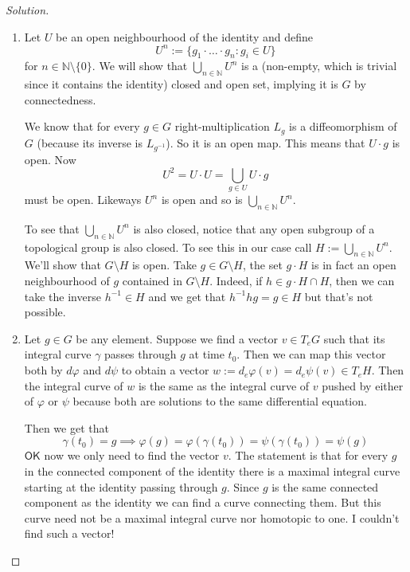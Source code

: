 \begin{proof}[Solution]\leavevmode
	\begin{enumerate}[label=\alph*.]
		\item Let $U$ be an open  neighbourhood of the identity and define
			\[U^n:=\{g_1\cdot\ldots \cdot g_n:g_{i}\in U\}\]
		for $n \in\mathbb{N}\setminus\{0\}$. We will show that $\bigcup_{n \in\mathbb{N}} U^n$ is a (non-empty, which is trivial since it contains the identity) closed and open set, implying it is $G$ by connectedness.

		We know that for every $g\in G$ right-multiplication $L_g$  is a diffeomorphism of $G$ (because its inverse is $L_{g^{-1}}$). So it is an open map. This means that $U\cdot g$ is open. Now
		\[U^2=U\cdot U=\bigcup_{g\in U}U\cdot g \]
		must be open. Likeways $U^n$ is open and so is $\bigcup_{n \in\mathbb{N}} U^n$.

		To see that $\bigcup_{n \in\mathbb{N}} U^n$ is also closed, notice that any open subgroup of a topological group is also closed. To see this in our case call $H:=\bigcup_{n \in\mathbb{N}} U^n$. We'll show that $G\setminus H$ is open. Take $g \in G\setminus H$, the set $g\cdot H$ is in fact an open neighbourhood of $g$ contained in $G\setminus H$. Indeed, if $h\in g\cdot H\cap H$, then we can take the inverse $h^{-1}\in H$ and we get that $h^{-1}hg=g\in H$ but that's not possible.



		\item Let $g\in G$ be any element. Suppose we find a vector $v\in T_eG$ such that its integral curve $\gamma$ passes through $g$ at time $t_0$. Then we can map this vector both by $d\varphi$ and $d\psi$ to obtain a vector $w:=d_e\varphi(v)=d_e\psi(v)\in T_eH$. Then the integral curve of  $w$ is the same as the integral curve of $v$ pushed by either of  $\varphi$ or $\psi$ because both are solutions to the same differential equation.

			Then we get that
			\[\gamma(t_0)=g\implies \varphi(g)=\varphi(\gamma(t_0))=\psi(\gamma(t_0))=\psi(g)\]
$\mathsf{OK}$ now we only need to find the vector $v$. The statement is that for every $g$ in the connected component of the identity there is a maximal integral curve starting at the identity passing through $g$. Since $g$ is the same connected component as the identity we can find a curve connecting them. But this curve need not be a maximal integral curve nor homotopic to one. {\color{3}I couldn't find such a vector!} 

	\end{enumerate}
\end{proof}

